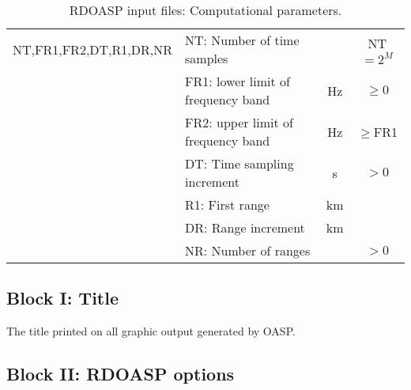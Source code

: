 \begin{table}
\begin{center}
\begin{tabular}{|l|l|c|c|}
\hline
NT,FR1,FR2,DT,R1,DR,NR & NT: Number of time samples & & NT$=2^{M}$ \\
	& FR1: lower limit of frequency band & Hz & $\geq 0$ \\
	& FR2: upper limit of frequency band & Hz & $\geq$FR1 \\
        & DT: Time sampling increment & s & $> 0$ \\ 
        & R1: First range & km & \\
        & DR: Range increment & km & \\
	& NR: Number of ranges & & $> 0$ \\
\hline
\end{tabular}
\end{center}
\caption{RDOASP input files: Computational parameters.
	\label{tab:rdoaspI} }
\end{table} 

\subsection{Block I: Title}

The title printed on all graphic output generated by OASP.

\subsection{Block II: RDOASP options}

